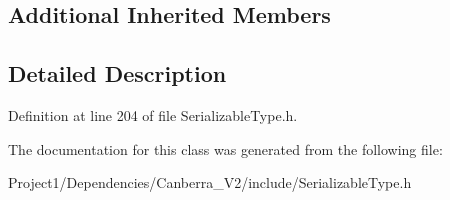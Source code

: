 \subsection*{Additional Inherited Members}


\subsection{Detailed Description}


Definition at line 204 of file Serializable\+Type.\+h.



The documentation for this class was generated from the following file\+:\begin{DoxyCompactItemize}
\item 
Project1/\+Dependencies/\+Canberra\+\_\+\+V2/include/Serializable\+Type.\+h\end{DoxyCompactItemize}
